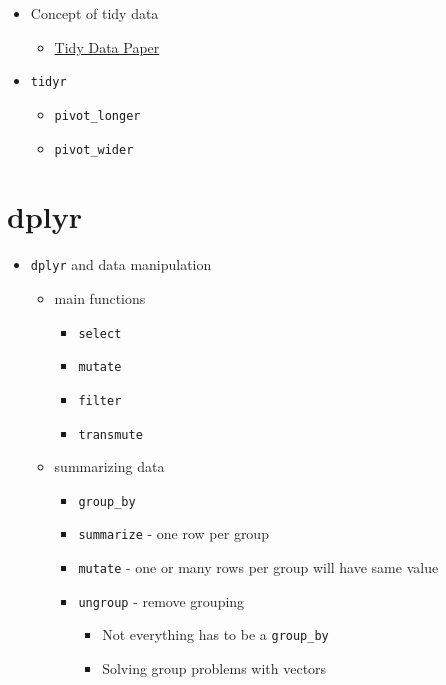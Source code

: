 \documentclass[
]{book}
\providecommand{\tightlist}{%
  \setlength{\itemsep}{0pt}\setlength{\parskip}{0pt}}
\begin{document}
\begin{itemize}
\tightlist
\item
  Concept of tidy data

  \begin{itemize}
  \tightlist
  \item
    \href{https://vita.had.co.nz/papers/tidy-data.pdf}{Tidy Data Paper}
  \end{itemize}
\item
  \texttt{tidyr}

  \begin{itemize}
  \tightlist
  \item
    \texttt{pivot\_longer}
  \item
    \texttt{pivot\_wider}
  \end{itemize}
\end{itemize}

\hypertarget{dplyr}{%
\chapter{dplyr}\label{dplyr}}

\begin{itemize}
\tightlist
\item
  \texttt{dplyr} and data manipulation

  \begin{itemize}
  \tightlist
  \item
    main functions

    \begin{itemize}
    \tightlist
    \item
      \texttt{select}
    \item
      \texttt{mutate}
    \item
      \texttt{filter}
    \item
      \texttt{transmute}
    \end{itemize}
  \item
    summarizing data

    \begin{itemize}
    \tightlist
    \item
      \texttt{group\_by}
    \item
      \texttt{summarize} - one row per group
    \item
      \texttt{mutate} - one or many rows per group will have same value
    \item
      \texttt{ungroup} - remove grouping

      \begin{itemize}
      \tightlist
      \item
        Not everything has to be a \texttt{group\_by}
      \item
        Solving group problems with vectors
      \end{itemize}
    \end{itemize}
  \end{itemize}
\end{itemize}
\end{document}
